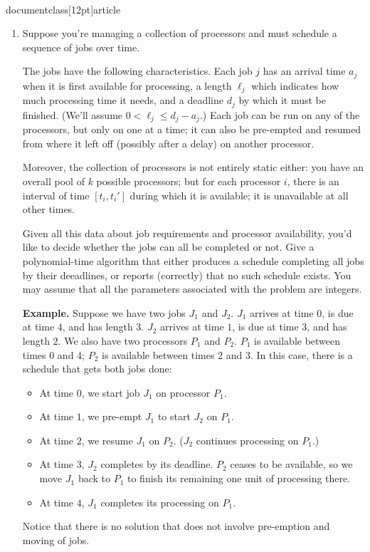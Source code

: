 \\documentclass[12pt]{article}
\begin{document}
\begin{enumerate}
\item 

Suppose you're managing a collection of processors
and must schedule a sequence of jobs over time.

The jobs have the following characteristics.
Each job $j$ has an arrival time $a_j$
when it is first available for processing,
a length $\ell_j$ which indicates how much processing
time it needs,
and a deadline $d_j$ by which it must be finished.
(We'll assume $0 < \ell_j \leq d_j - a_j$.)
Each job can be run on any of the processors,
but only on one at a time; it can also be
pre-empted and resumed from where it left off
(possibly after a delay) on another processor.

Moreover, the collection of processors is not
entirely static either:
you have an overall pool of $k$ possible processors;
but for each processor $i$, there is an interval of time
$[t_i,t_i']$ during which it is available;
it is unavailable at all other times.

Given all this data about job requirements and processor
availability, you'd like to decide whether
the jobs can all be completed or not.
Give a polynomial-time algorithm that either
produces a schedule completing all jobs by
their deeadlines, or reports (correctly)
that no such schedule exists.
You may assume that all the parameters associated
with the problem are integers.

{\bf Example.}
Suppose we have two jobs $J_1$ and $J_2$.
$J_1$ arrives at time $0$, is due at time $4$,
and has length $3$.
$J_2$ arrives at time $1$, is due at time $3$,
and has length $2$.
We also have two processors $P_1$ and $P_2$.
$P_1$ is available between times $0$ and $4$;
$P_2$ is available between times $2$ and $3$.
In this case, there is a schedule that gets both jobs done:
\begin{itemize}
\item At time $0$, we start job $J_1$ on processor $P_1$.
\item At time $1$, we pre-empt $J_1$ to start $J_2$ on $P_1$.
\item At time $2$, we resume $J_1$ on $P_2$.
($J_2$ continues processing on $P_1$.)
\item At time $3$, $J_2$ completes by its deadline.
$P_2$ ceases to be available, so we move $J_1$ back to
$P_1$ to finish its remaining one unit of processing there.
\item At time $4$, $J_1$ completes its processing on $P_1$.
\end{itemize}
Notice that there is no solution that does not involve
pre-emption and moving of jobs.


\end{enumerate}
\end{document}
